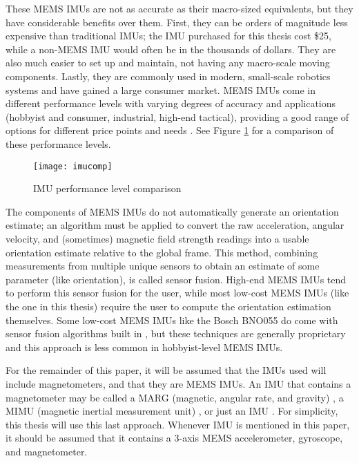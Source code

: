 \documentclass[11pt]{ucthesisCP}
\begin{document}
These MEMS IMUs are not as accurate as their macro-sized equivalents, but they have considerable benefits over them. First, they can be orders of magnitude less expensive than traditional IMUs; the IMU purchased for this thesis cost \$25, while a non-MEMS IMU would often be in the thousands of dollars. They are also much easier to set up and maintain, not having any macro-scale moving components. Lastly, they are commonly used in modern, small-scale robotics systems and have gained a large consumer market. MEMS IMUs come in different performance levels with varying degrees of accuracy and applications (hobbyist and consumer, industrial, high-end tactical), providing a good range of options for different price points and needs \cite{imuadvnav}. See Figure \ref{fig:imucomp} for a comparison of these performance levels.

\begin{figure}[htbp]
	\centering
	\texttt{[image: imucomp]}
	\caption{IMU performance level comparison \cite{imuadvnav}}
	\label{fig:imucomp}
\end{figure}

The components of MEMS IMUs do not automatically generate an orientation estimate; an algorithm must be applied to convert the raw acceleration, angular velocity, and (sometimes) magnetic field strength readings into a usable orientation estimate relative to the global frame. This method, combining measurements from multiple unique sensors to obtain an estimate of some parameter (like orientation), is called sensor fusion. High-end MEMS IMUs tend to perform this sensor fusion for the user, while most low-cost MEMS IMUs (like the one in this thesis) require the user to compute the orientation estimation themselves. Some low-cost MEMS IMUs like the Bosch BNO055 do come with sensor fusion algorithms built in \cite{bno055}, but these techniques are generally proprietary and this approach is less common in hobbyist-level MEMS IMUs.

For the remainder of this paper, it will be assumed that the IMUs used will include magnetometers, and that they are MEMS  IMUs. An IMU that contains a magnetometer may be called a MARG (magnetic, angular rate, and gravity) \cite{madgwick}, a MIMU (magnetic inertial measurement unit) \cite{sfcomp}, or just an IMU \cite{imuadvnav}. For simplicity, this thesis will use this last approach. Whenever IMU is mentioned in this paper, it should be assumed that it contains a 3-axis MEMS accelerometer, gyroscope, and magnetometer.
\end{document}
